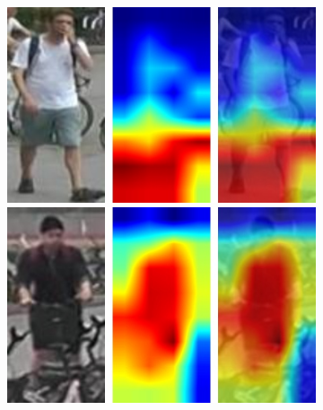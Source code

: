 \begin{figure}
    \vspace{10 pt}
    
    \begin{subfigure}[b]{0.98\textwidth}
        \centering
        \includegraphics[width=0.45\columnwidth]{5_unlearn/figs/scrub/0006_mob_rem1.jpg}
        \hspace{15pt}
        \includegraphics[width=0.45\columnwidth]{5_unlearn/figs/scrub/0014_mob_ret1.jpg}
    \end{subfigure}
    
    \vspace{10 pt}
    
    \begin{subfigure}[b]{0.98\textwidth}
        \centering
    \hspace{15pt}
    

\end{subfigure}
\end{figure}
